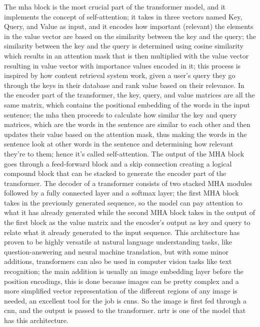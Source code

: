 The \gls{mha} block is the most crucial part of the transformer model, and it implements the concept of self-attention; it takes in three vectors named Key, Query, and Value as input, and it encodes how important (relevant) the elements in the value vector are based on the similarity between the key and the query; the similarity between the key and the query is determined using cosine similarity which results in an attention mask that is then multiplied with the value vector resulting in value vector with importance values encoded in it; this process is inspired by how content retrieval system work, given a user's query they go through the keys in their database and rank value based on their relevance. In the encoder part of the transformer, the key, query, and value matrices are all the same matrix, which contains the positional embedding of the words in the input sentence; the \gls{mha} then proceeds to calculate how similar the key and query matrices, which are the words in the sentence are similar to each other and then updates their value based on the attention mask, thus making the words in the sentence look at other words in the sentence and determining how relevant they're to them; hence it's called self-attention. The output of the MHA block goes through a feed-forward block and a skip connection creating a logical compound block that can be stacked to generate the encoder part of the transformer. The decoder of a transformer consists of two stacked MHA modules followed by a fully connected layer and a softmax layer; the first MHA block takes in the previously generated sequence, so the model can pay attention to what it has already generated while the second MHA block takes in the output of the first block as the value matrix and the encoder's output as key and query to relate what it already generated to the input sequence. This architecture has proven to be highly versatile at natural language understanding tasks, like question-answering and neural machine translation, but with some minor additions, transformers can also be used in computer vision tasks like text recognition; the main addition is usually an image embedding layer before the position encodings, this is done because images can be pretty complex and a more simplified vector representation of the different regions of any image is needed, an excellent tool for the job is \gls{cnn}s. So the image is first fed through a \gls{cnn}, and the output is passed to the transformer. \label{nrtr}\mbox{\gls{nrtr}} \cite{sheng_nrtr_2019} is one of the model that has this architecture.

